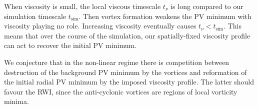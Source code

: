 When viscosity is small, the local viscous timescale $t_\nu$ is long compared to our
simulation timescale $t_\mathrm{sim}$. Then vortex formation weakens the PV minimum
with viscosity playing no role. Increasing viscosity eventually causes
$t_\nu<t_\mathrm{sim}$. This means that over the course of the
simulation, our spatially-fixed viscosity profile can act to recover the
initial PV minimum.  

We conjecture that in the non-linear regime there is competition 
between destruction of the background PV minimum by the 
vortices and reformation of the initial radial PV minimum by the
imposed viscosity profile. The latter should favour the RWI, since the
anti-cyclonic vortices are regions of local vorticity minima.  
 



